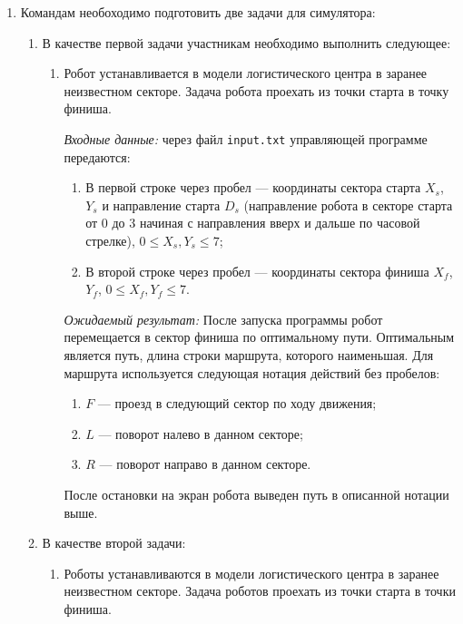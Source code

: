 
\begin{enumerate}
    \item Командам необоходимо подготовить две задачи для симулятора:
    \begin{enumerate}
        \item В качестве первой задачи участникам необходимо выполнить следующее:
        \begin{enumerate}
            \item Робот устанавливается в модели логистического центра в заранее неизвестном секторе.
                Задача робота проехать из точки старта в точку финиша.

            \textit{Входные данные:} через файл \texttt{input.txt} управляющей программе передаются:
            \begin{enumerate}
                \item В первой строке через пробел --- координаты сектора старта $X_s$, $Y_s$ и направление старта
                    $D_s$ (направление робота в секторе старта от 0 до 3 начиная с направления вверх и дальше по часовой стрелке), $0 \le X_s, Y_s \le 7$;
                \item В второй строке через пробел --- координаты сектора финиша $X_f$, $Y_f$, $0 \le X_f, Y_f \le 7$.
            \end{enumerate}

            \textit{Ожидаемый результат:} После запуска программы робот перемещается в сектор
            финиша по оптимальному пути. Оптимальным является путь, длина строки маршрута, которого наименьшая.
            Для маршрута используется следующая нотация действий без пробелов:
            \begin{enumerate}
                \item $F$ --- проезд в следующий сектор по ходу движения;
                \item $L$ --- поворот налево в данном секторе;
                \item $R$ --- поворот направо в данном секторе.
            \end{enumerate}
            После остановки на экран робота выведен путь в описанной нотации выше.
        \end{enumerate}
        \item В качестве второй задачи:
        \begin{enumerate}
            \item Роботы устанавливаются в модели логистического центра в заранее неизвестном секторе.
            Задача роботов проехать из точки старта в точки финиша.


\end{enumerate}
\end{enumerate}
\end{enumerate}
